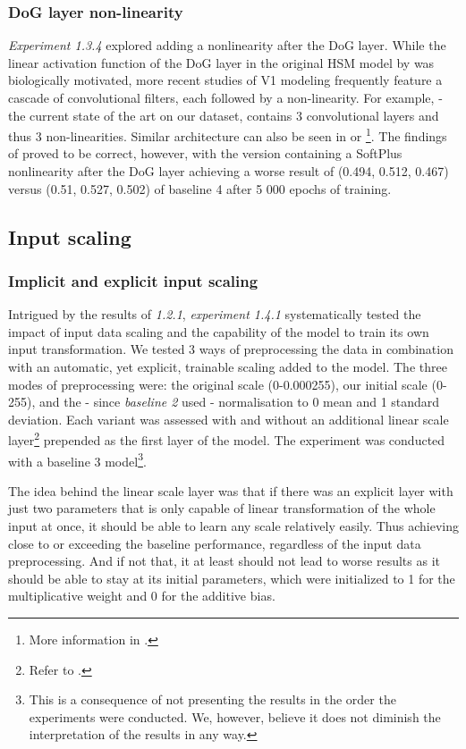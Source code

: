 \subsubsection{DoG layer non-linearity}\label{ex:1.3.4}

\textit{Experiment 1.3.4} explored adding a nonlinearity after the DoG layer. While the linear activation function of the DoG layer in the original HSM model by \cite{antolik} was biologically motivated, more recent studies of V1 modeling frequently feature a cascade of convolutional filters, each followed by a non-linearity. For example, \cite{klindt} - the current state of the art on our dataset, contains 3 convolutional layers and thus 3 non-linearities. Similar architecture can also be seen in \cite{ecker} or \cite{Walke506956}\footnote{More information in .}. The findings of \citeauthor{antolik} proved to be correct, however, with the version containing a SoftPlus nonlinearity after the DoG layer achieving a worse result of (0.494, 0.512, 0.467) versus (0.51, 0.527, 0.502) of baseline 4 after 5 000 epochs of training.

\subsection{Input scaling}
\subsubsection{Implicit and explicit input scaling}

Intrigued by the results of \textit{1.2.1}, \textit{experiment 1.4.1} systematically tested the impact of input data scaling and the capability of the model to train its own input transformation. We tested 3 ways of preprocessing the data in combination with an automatic, yet explicit, trainable scaling added to the model. The three modes of preprocessing were: the original scale (0-0.000255), our initial scale (0-255), and the - since \textit{baseline 2} used - normalisation to 0 mean and 1 standard deviation. Each variant was assessed with and without an additional linear scale layer\footnote{Refer to .} prepended as the first layer of the model. The experiment was conducted with a baseline 3 model\footnote{This is a consequence of not presenting the results in the order the experiments were conducted. We, however, believe it does not diminish the interpretation of the results in any way.}.

The idea behind the linear scale layer was that if there was an explicit layer with just two parameters that is only capable of linear transformation of the whole input at once, it should be able to learn any scale relatively easily. Thus achieving close to or exceeding the baseline performance, regardless of the input data preprocessing. And if not that, it at least should not lead to worse results as it should be able to stay at its initial parameters, which were initialized to 1 for the multiplicative weight and 0 for the additive bias.

